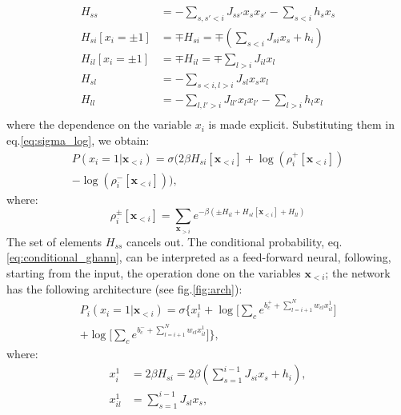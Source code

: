 \documentclass[aps,physrev,10pt,floatfix,reprint]{revtex4-2}
\begin{document}
\begin{align*}
    H_{ss} &= -\sum_{s,s'<i}J_{ss'} x_s x_{s'} - \sum_{s<i} h_s x_s \\
    H_{si}[x_i=\pm 1] & =  \mp H_{si} = \mp (\sum_{s<i} J_{si} x_s + h_i)  \\
    H_{il}[x_i = \pm 1] & = \mp H_{il} = \mp \sum_{l>i} J_{il} x_l\\
    H_{sl} &= -\sum_{s<i,l>i}J_{sl} x_s x_{l}\\
    H_{ll} &= -\sum_{l,l'>i}J_{ll'} x_l x_{l'} - \sum_{l>i} h_l x_l \\
\end{align*}
where the dependence on the variable $x_i$ is made explicit. Substituting them in eq.\ref{eq:sigma_log}, we obtain:
\begin{equation}
    \label{eq:conditional_ghann}
    \begin{split}
     P\left(x_{i}=1|\mathbf{x}_{<i}\right) = \sigma\bigg( 2 \beta H_{si}[\mathbf{x}_{<i}] +\log(\rho_i^+[\mathbf{x}_{<i}]) \\
     - \log(\rho_i^-[\mathbf{x}_{<i}])
    \bigg),   
    \end{split}
\end{equation}
where:
\begin{equation}
    \rho_i^{\pm} [\mathbf{x}_{<i}]  = \sum_{\mathbf{x}_{>i}}  e^{-\beta(\pm H_{il} + H_{sl}[\mathbf{x}_{<i}] + H_{ll})}
\label{eq:rho_ghann}
\end{equation}
The set of elements $H_{ss}$ cancels out.
The conditional probability, eq.\ref{eq:conditional_ghann}, can be interpreted as a feed-forward neural, following, starting from the input, the operation done on the variables $\mathbf{x}_{<i}$; the network has the following architecture (see fig.\ref{fig:arch}):
\begin{multline}
    \label{eq:H2ANN}
        P_i\left(x_i=1 | \mathbf{x}_{<i}\right) = 
     \sigma \bigg\{ x_i^1 + \log\big[ \sum_{c} e^{b_c^+ + \sum_{l=i+1}^{N} w_{cl} x_{il}^1}\big]\\
     +\log\big[ \sum_{c} e^{b_c^- + \sum_{l=i+1}^{N} w_{cl} x_{il}^1}\big] \bigg\},
\end{multline}
where:
\begin{align}
    \label{eq:x_i_first}
    x_i^1 &= 2 \beta H_{si} =  2 \beta( \sum_{s=1}^{i-1} J_{si} x_s + h_i),\\
    \label{eq:x_il_first}
    x_{il}^1 &= \sum_{s=1}^{i-1} J_{sl} x_s,
\end{align}
\end{document}
